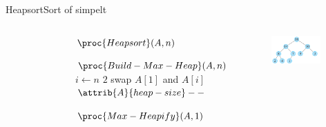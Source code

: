 \documentclass[aspectratio=1610]{beamer}
\begin{document}
\begin{frame}{Heapsort}{Sort of simpelt}
\begin{columns}
\begin{figure}[h]
{            }
        \end{figure}
    
        \begin{block}{$\proc{Heapsort}(A,n)$}
            \scriptsize
            
            \vspace{-\abovedisplayskip}
            \begin{codebox}
                \li $\proc{Build-Max-Heap}(A,n)$
                \li \For $i \gets n$ \Downto $2$
                \li     \Do
                            swap $A[1]$ and $A[i]$
                \li         $\attrib{A}{heap-size}--$
                      
                \li         $\proc{Max-Heapify}(A,1)$         
                        \End
            \end{codebox}
        \end{block}

        \footnotesize
        \begin{figure}[h]
            \centering
            \includegraphics[width=0.9\textwidth]{heaps/heapsort-a}
        \end{figure}


\end{columns}
\end{frame}
\end{document}
